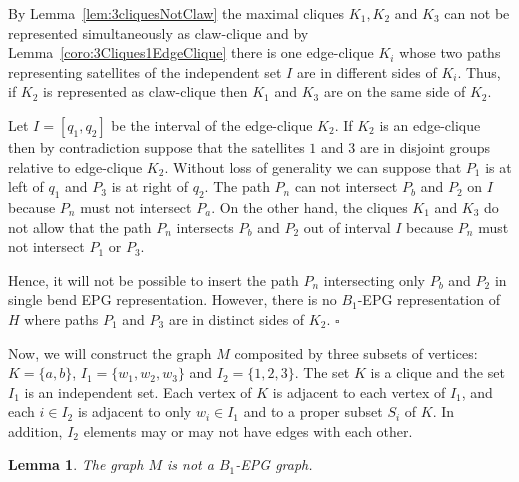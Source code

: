 \documentclass[9pt]{entcs}
\newtheorem{lema}[thm]{Lemma}%
\begin{document}
\begin{pf}
By Lemma~\ref{lem:3cliquesNotClaw} the maximal cliques $K_1, K_2$ and $K_3$ can not be represented simultaneously as claw-clique and by Lemma~\ref{coro:3Cliques1EdgeClique} there is one edge-clique $K_i$ whose two paths representing satellites of the independent set $I$ are in different sides of  $K_i$. Thus, if $K_2$ is represented as claw-clique then $K_1$ and $K_3$ are on the same side of $K_2$.

Let $I=[q_1,q_2]$ be the interval of the edge-clique $K_2$.  If $K_2$ is an edge-clique then by contradiction suppose that the satellites $1$ and $3$ are in disjoint groups relative to edge-clique $K_2$. Without loss of generality we can suppose that $P_1$ is at left of $q_1$ and $P_3$ is at right of $q_2$. The path $P_n$ can not intersect $P_b$ and $P_2$ on $I$ because $P_n$ must not intersect $P_a$. On the other hand, the cliques $K_1$ and $K_3$ do not allow that the path $P_n$ intersects $P_b$ and $P_2$ out of interval $I$ because $P_n$ must not intersect $P_1$ or $P_3$.

 Hence, it will not be possible to insert the path $P_{n}$ intersecting only $P_{b}$ and $P_{2}$ in single bend EPG representation. However, there is no $B_1$-EPG representation of $H$ %
 where paths $P_1$ and $P_3$ are in distinct sides of $K_2$. $\square$

 \end{pf} 

Now, we will construct the graph $M$ composited by three subsets of vertices: $K=\{a,b\}$, $I_1=\{w_1,w_2,w_3\}$  and
$I_2=\{1,2,3\}$. The set $K$ is a clique and the set $I_1$ is an independent set. Each vertex of $K$ is adjacent to each vertex of $I_1$, and each  $i\in I_2$ is adjacent to only $w_i\in I_1$ and to a proper subset $S_i$ of $K$. In addition, $I_2$ elements may or may not have edges with each other.


\begin{lema}\label{lem:cb''}
The graph $M$  is not a  $B_1$-EPG graph.
\end{lema}
\end{document}
